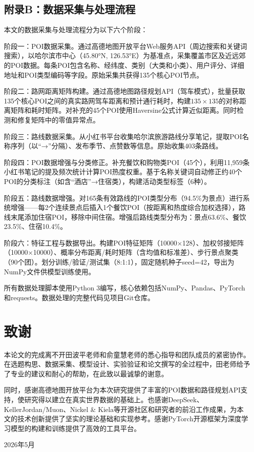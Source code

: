 \documentclass[12pt,a4paper]{ctexart}
\begin{document}
\subsection*{附录B：数据采集与处理流程}
{\songti\fontsize{12pt}{24pt}\selectfont

本文的数据采集与处理流程分为以下六个阶段：

阶段一：POI数据采集。通过高德地图开放平台Web服务API（周边搜索和关键词搜索），以哈尔滨市中心（45.80°N, 126.53°E）为基准点，采集覆盖市区及近远郊的POI数据。每条POI包含名称、经纬度、类别（大类和小类）、用户评分、详细地址和POI类型编码等字段。原始采集共获得135个核心POI节点。

阶段二：路网距离矩阵构建。通过高德地图路径规划API（驾车模式），批量获取135个核心POI之间的真实路网驾车距离和预计通行耗时，构建$135\times135$的对称距离矩阵和耗时矩阵。对补充的45个POI使用Haversine公式计算近似距离。同时检测和修复矩阵中的零值异常点。

阶段三：路线数据采集。从小红书平台收集哈尔滨旅游路线分享笔记，提取POI名称序列（以“→”分隔）、发布季节、点赞数等信息。原始收集403条路线。

阶段四：POI数据增强与分类修正。补充餐饮和购物类POI（45个），利用11,959条小红书笔记的提及频次统计计算POI热度权重。基于名称关键词自动修正约40个POI的分类标注（如含“酒店”→住宿类），构建活动类型标签（6种）。

阶段五：路线数据增强。对165条有效路线的POI类型分布（94.5\%为景点）进行系统增强——每2个连续景点后插入1个餐饮POI（按距离和热度综合加权选择），路线末尾添加住宿POI，移除中间住宿。增强后路线类型分布为：景点63.6\%、餐饮23.5\%、住宿10.4\%。

阶段六：特征工程与数据导出。构建POI特征矩阵（10000×128）、加权邻接矩阵（10000×10000）、概率分布距离/耗时矩阵（含均值和标准差）、步行景点聚类（90个团）。划分训练/验证/测试集（8:1:1），固定随机种子seed=42，导出为NumPy文件供模型训练使用。

所有数据处理脚本使用Python 3编写，核心依赖包括NumPy、Pandas、PyTorch和requests。数据处理的完整代码见项目Git仓库。
}

\newpage

\section*{\centering\heiti\fontsize{14pt}{24pt}\selectfont 致\quad 谢}
\vspace{12pt}
{\songti\fontsize{12pt}{24pt}\selectfont

本论文的完成离不开田波平老师和俞童慧老师的悉心指导和团队成员的紧密协作。在选题构思、数据采集、模型设计、实验验证和论文撰写的全过程中，田老师给予了专业的建议和耐心的帮助，在此致以最诚挚的谢意。

同时，感谢高德地图开放平台为本次研究提供了丰富的POI数据和路径规划API支持，使研究得以建立在真实世界数据的基础上。也感谢DeepSeek、KellerJordan/Muon、Nickel \& Kiela等开源社区和研究者的前沿工作成果，为本文的技术创新提供了坚实的理论基础和实现参考。感谢PyTorch开源框架为深度学习模型的构建和训练提供了高效的工具平台。

\vspace{24pt}
\hfill 2026年5月
}
\end{document}
